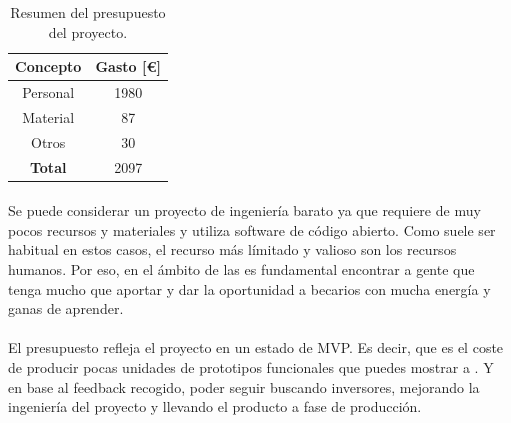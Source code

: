 \begin{table}[hbt]
	\label{t:resumencostes}
	\centering
	\begin{tabular}{|c|c|}
		\hline
		\textbf{Concepto} & \textbf{Gasto [\euro]} \\
		\hline
		Personal & 1980 \\
		\hline
		Material & 87 \\
		\hline
		Otros & 30 \\
		\hline
		\textbf{Total} & 2097 \\
		\hline
	\end{tabular}
    \caption{Resumen del presupuesto del proyecto.}
\end{table}

\paragraph{}Se puede considerar un proyecto de ingeniería barato ya que requiere de
muy pocos recursos y materiales y utiliza software de código abierto. Como suele ser
habitual en estos casos, el recurso más límitado y valioso son los recursos humanos.
Por eso, en el ámbito de las  es fundamental encontrar a gente
que tenga mucho que aportar y dar la oportunidad a becarios con mucha energía y ganas
de aprender.

\paragraph{}El presupuesto refleja el proyecto en un estado de \gls{MVP}. Es decir,
que es el coste de producir pocas unidades de prototipos funcionales que puedes mostrar
a . Y en base al feedback recogido, poder seguir buscando inversores,
mejorando la ingeniería del proyecto y llevando el producto a fase de producción.
